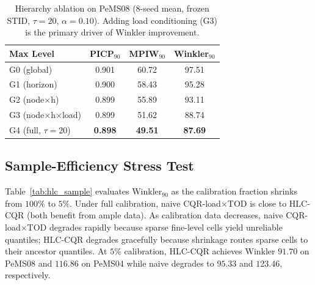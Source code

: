 \documentclass[letterpaper,journal]{IEEEtran}
\begin{document}
\begin{table}[t]
\centering
\caption{Hierarchy ablation on PeMS08 (8-seed mean, frozen STID, $\tau=20$,
$\alpha=0.10$).  Adding load conditioning (G3) is the primary driver of
Winkler improvement.}
\label{tab:hlc_hierarchy}
\footnotesize
\begin{tabular}{lccc}
\toprule
Max Level & PICP$_{90}$ & MPIW$_{90}$ & Winkler$_{90}$ \\
\midrule
G0 (global)              & 0.901 & 60.72 & 97.51 \\
G1 (horizon)             & 0.900 & 58.43 & 95.28 \\
G2 (node$\times$h)       & 0.899 & 55.89 & 93.11 \\
G3 (node$\times$h$\times$load) & 0.899 & 51.62 & 88.74 \\
G4 (full, $\tau=20$)     & \textbf{0.898} & \textbf{49.51} & \textbf{87.69} \\
\bottomrule
\end{tabular}
\end{table}

\subsection{Sample-Efficiency Stress Test}
\label{sec:sample_efficiency}

Table~\ref{tab:hlc_sample} evaluates Winkler$_{90}$ as the calibration
fraction shrinks from $100\%$ to $5\%$.  Under full calibration, naive
CQR-load$\times$TOD is close to HLC-CQR (both benefit from ample data).
As calibration data decreases, naive CQR-load$\times$TOD degrades rapidly
because sparse fine-level cells yield unreliable quantiles; HLC-CQR
degrades gracefully because shrinkage routes sparse cells to their
ancestor quantiles.  At $5\%$ calibration, HLC-CQR achieves Winkler
$91.70$ on PeMS08 and $116.86$ on PeMS04 while naive degrades to $95.33$
and $123.46$, respectively.
\end{document}
